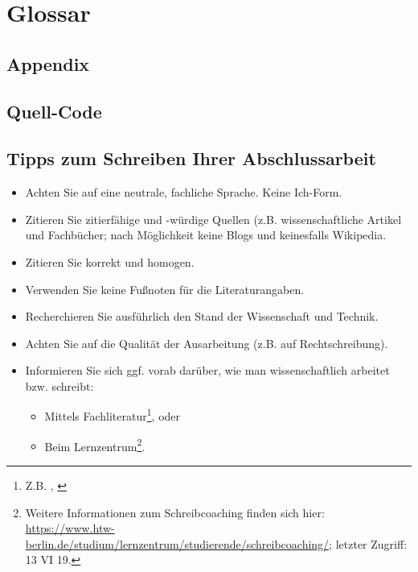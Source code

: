 \documentclass[oneside,bibliography=totocnumbered,BCOR=5mm]{scrbook}
\begin{document}
\chapter{Glossar}
\begin{appendix}
\chapter{Appendix}

\section{Quell-Code}

\section{Tipps zum Schreiben Ihrer Abschlussarbeit}

\begin{itemize}
\item Achten Sie auf eine neutrale, fachliche Sprache. Keine \glqq{}Ich\grqq{}-Form.
\item Zitieren Sie zitierf\"ahige und -w\"urdige Quellen (z.B. wissenschaftliche Artikel und Fachb\"ucher; nach M\"oglichkeit keine Blogs und keinesfalls Wikipedia.
\item Zitieren Sie korrekt und homogen.
\item Verwenden Sie keine Fu{\ss}noten f\"ur die Literaturangaben.
\item Recherchieren Sie ausf\"uhrlich den Stand der Wissenschaft und Technik.
\item Achten Sie auf die Qualit\"at der Ausarbeitung (z.B. auf Rechtschreibung).
\item Informieren Sie sich ggf. vorab dar\"uber, wie man wissenschaftlich arbeitet bzw. schreibt:
\begin{itemize}
\item Mittels Fachliteratur\footnote{Z.B. \autocite{balzert2011}, \autocite{franck2013}}, oder
\item Beim Lernzentrum\footnote{Weitere Informationen zum Schreibcoaching finden sich hier: \url{https://www.htw-berlin.de/studium/lernzentrum/studierende/schreibcoaching/}; letzter Zugriff: 13 VI 19.}.
\end{itemize}
\end{itemize}

\newpage
\thispagestyle{empty}
\noindent


\end{appendix}
\end{document}
